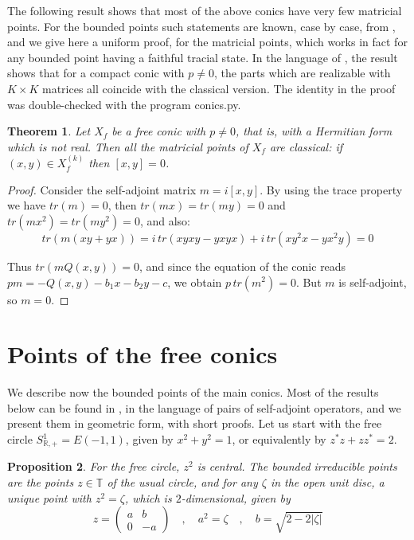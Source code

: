 \documentclass[11pt]{amsart}
\newtheorem{theorem}{Theorem}[section]
\newtheorem{proposition}[theorem]{Proposition}
\theoremstyle{definition}
\begin{document}
The following result shows that most of the above conics have very few matricial points. For the bounded points such statements are known, case by case, from \cite{os1}, and we give here a uniform proof, for the matricial points, which works in fact for any bounded point having a faithful tracial state. In the language of \cite{bbi}, the result shows that for a compact conic with $p\neq0$, the parts which are realizable with $K\times K$ matrices all coincide with the classical version. The identity in the proof was double-checked with the program conics.py.

\begin{theorem}\label{t32}
Let $X_f$ be a free conic with $p\neq0$, that is, with a Hermitian form which is not real. Then all the matricial points of $X_f$ are classical: if $(x,y)\in X_f^{(k)}$ then $[x,y]=0$.
\end{theorem}

\begin{proof}
Consider the self-adjoint matrix $m=i[x,y]$. By using the trace property we have $tr(m)=0$, then $tr(mx)=tr(my)=0$ and $tr(mx^2)=tr(my^2)=0$, and also:
$$tr(m(xy+yx))=i\,tr(xyxy-yxyx)+i\,tr(xy^2x-yx^2y)=0$$

Thus $tr(mQ(x,y))=0$, and since the equation of the conic reads $pm=-Q(x,y)-b_1x-b_2y-c$, we obtain $p\,tr(m^2)=0$. But $m$ is self-adjoint, so $m=0$.
\end{proof}

\section{Points of the free conics}

We describe now the bounded points of the main conics. Most of the results below can be found in \cite{os1}, in the language of pairs of self-adjoint operators, and we present them in geometric form, with short proofs. Let us start with the free circle $S^1_{\mathbb R,+}=E(-1,1)$, given by $x^2+y^2=1$, or equivalently by $z^*z+zz^*=2$.

\begin{proposition}\label{p41}
For the free circle, $z^2$ is central. The bounded irreducible points are the points $z\in\mathbb T$ of the usual circle, and for any $\zeta$ in the open unit disc, a unique point with $z^2=\zeta$, which is $2$-dimensional, given by
$$z=\begin{pmatrix}a&b\\0&-a\end{pmatrix}\quad,\quad a^2=\zeta\quad,\quad b=\sqrt{2-2|\zeta|}$$
\end{proposition}
\end{document}
